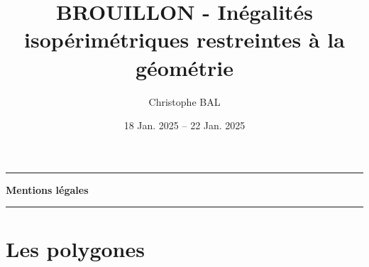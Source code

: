 \documentclass[12pt]{amsart}
\begin{document}
\title{BROUILLON - Inégalités isopérimétriques restreintes à la géométrie}
\author{Christophe BAL}
\date{18 Jan. 2025 -- 22 Jan. 2025}
\maketitle


\begin{center}
	\hrule\vspace{.3em}
	{
		\fontsize{1.35em}{1em}\selectfont
		\textbf{Mentions \og légales \fg}
	}
			
	\vspace{0.45em}
	\doclicenseThis
	\hrule
\end{center}



\setcounter{tocdepth}{2}
\tableofcontents




\newpage

%
%
%
%
%
%
%
%
%
%
%
%
%
%
%
%
%
%
%
%
%
%
%
%
%
%
%
%
%
%
%
%
%
%


\section{Les polygones}


\end{document}

